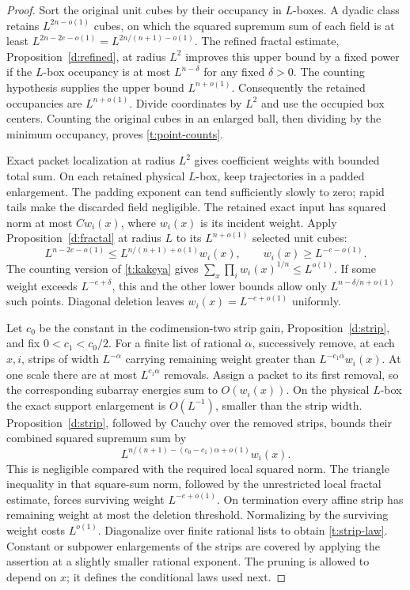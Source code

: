 \begin{proof}
Sort the original unit cubes by their occupancy in $L$-boxes.  A dyadic
class retains $L^{2n-o(1)}$ cubes, on which the squared supremum sum of
each field is at least $L^{2n-2e-o(1)}=L^{2n/(n+1)-o(1)}$.
The refined fractal estimate, Proposition~\ref{d:refined}, at radius
$L^2$ improves this upper bound by a fixed power if the $L$-box
occupancy is at most $L^{n-\delta}$ for any fixed $\delta>0$.
The counting hypothesis supplies the upper bound $L^{n+o(1)}$.
Consequently the retained occupancies are $L^{n+o(1)}$.
Divide coordinates by $L^2$ and use the occupied box centers.  Counting
the original cubes in an enlarged ball, then dividing by the minimum
occupancy, proves \eqref{t:point-counts}.

Exact packet localization at radius $L^2$ gives coefficient weights with
bounded total sum.  On each retained physical $L$-box, keep trajectories
in a padded enlargement.  The padding exponent can tend sufficiently
slowly to zero; rapid tails make the discarded field negligible.
The retained exact input has squared norm at most $Cw_i(x)$, where
$w_i(x)$ is its incident weight.  Apply Proposition~\ref{d:fractal}
at radius $L$ to its $L^{n+o(1)}$ selected unit cubes:
\[
 L^{n-2e-o(1)}\le L^{n/(n+1)+o(1)}w_i(x),
 \qquad w_i(x)\ge L^{-e-o(1)}.
\]
The counting version of \eqref{t:kakeya} gives
$\sum_x\prod_iw_i(x)^{1/n}\le L^{o(1)}$.  If some weight exceeds
$L^{-e+\delta}$, this and the other lower bounds allow only
$L^{n-\delta/n+o(1)}$ such points.  Diagonal deletion leaves
$w_i(x)=L^{-e+o(1)}$ uniformly.

Let $c_0$ be the constant in the codimension-two strip gain,
Proposition~\ref{d:strip}, and fix $0<c_1<c_0/2$.  For a finite list of
rational $\alpha$, successively remove, at each $x,i$, strips of width
$L^{-\alpha}$ carrying remaining weight greater than
$L^{-c_1\alpha}w_i(x)$.  At one scale there are at most
$L^{c_1\alpha}$ removals.  Assign a packet to its first removal, so
the corresponding subarray energies sum to $O(w_i(x))$.  On the
physical $L$-box the exact support enlargement is $O(L^{-1})$, smaller
than the strip width.  Proposition~\ref{d:strip}, followed by Cauchy
over the removed strips, bounds their combined squared supremum sum by
\[
 L^{n/(n+1)-(c_0-c_1)\alpha+o(1)}w_i(x).
\]
This is negligible compared with the required local squared norm.
The triangle inequality in that square-sum norm, followed by the
unrestricted local fractal estimate, forces surviving weight
$L^{-e+o(1)}$.  On termination every affine strip has remaining weight
at most the deletion threshold.  Normalizing by the surviving weight
costs $L^{o(1)}$.  Diagonalize over finite rational lists to obtain
\eqref{t:strip-law}.  Constant or subpower enlargements of the strips
are covered by applying the assertion at a slightly smaller rational
exponent.  The pruning is allowed to depend on $x$; it defines the
conditional laws used next.
\end{proof}

